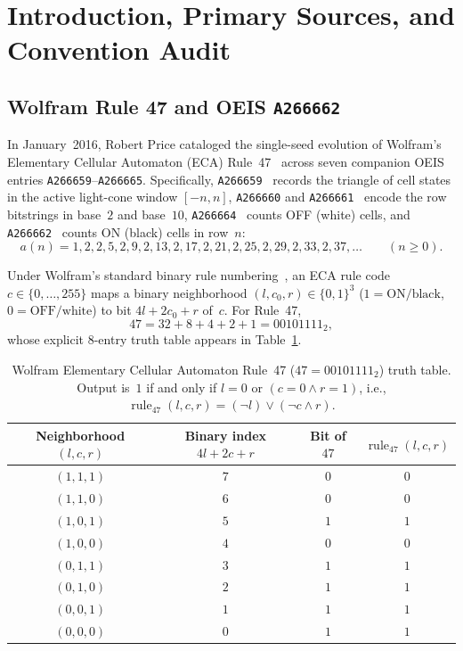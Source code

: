 \documentclass[11pt]{article}
\theoremstyle{definition}
\newcommand{\seq}[1]{\texttt{#1}}
\newcommand{\ruleFS}{\operatorname{rule}_{47}}
\begin{document}
\section{Introduction, Primary Sources, and Convention Audit}

\subsection{Wolfram Rule 47 and OEIS \texorpdfstring{\seq{A266662}}{A266662}}

In January~2016, Robert Price cataloged the single-seed evolution of Wolfram's Elementary Cellular Automaton (ECA) Rule~47~\cite{wolfram2002,mathworldECA} across seven companion OEIS entries \seq{A266659}--\seq{A266665}. Specifically, \seq{A266659}~\cite{oeis266659} records the triangle of cell states in the active light-cone window $[-n, n]$, \seq{A266660} and \seq{A266661}~\cite{oeis266660,oeis266661} encode the row bitstrings in base~$2$ and base~$10$, \seq{A266664}~\cite{oeis266664} counts OFF (white) cells, and \seq{A266662}~\cite{oeis266662} counts ON (black) cells in row~$n$:
\[
a(n) = 1, 2, 2, 5, 2, 9, 2, 13, 2, 17, 2, 21, 2, 25, 2, 29, 2, 33, 2, 37, \dots \qquad (n \ge 0).
\]

Under Wolfram's standard binary rule numbering~\cite{wolfram2002}, an ECA rule code $c \in \{0, \dots, 255\}$ maps a binary neighborhood $(l, c_0, r) \in \{0, 1\}^3$ ($1 = \text{ON/black}$, $0 = \text{OFF/white}$) to bit $4l + 2c_0 + r$ of~$c$. For Rule~47,
\[
47 = 32 + 8 + 4 + 2 + 1 = 00101111_2,
\]
whose explicit $8$-entry truth table appears in Table~\ref{tab:rule47-tt}.

\begin{table}[ht]
\centering
\caption{Wolfram Elementary Cellular Automaton Rule~47 ($47 = 00101111_2$) truth table. Output is~$1$ if and only if $l = 0$ or $(c = 0 \land r = 1)$, i.e., $\ruleFS(l, c, r) = (\neg l) \lor (\neg c \land r)$.}
\label{tab:rule47-tt}
\smallskip
{\small
\begin{tabular}{@{}c c c c@{}}
\toprule
Neighborhood $(l, c, r)$ & Binary index $4l + 2c + r$ & Bit of $47$ & $\ruleFS(l, c, r)$ \\
\midrule
$(1, 1, 1)$ & $7$ & $0$ & $0$ \\
$(1, 1, 0)$ & $6$ & $0$ & $0$ \\
$(1, 0, 1)$ & $5$ & $1$ & $1$ \\
$(1, 0, 0)$ & $4$ & $0$ & $0$ \\
$(0, 1, 1)$ & $3$ & $1$ & $1$ \\
$(0, 1, 0)$ & $2$ & $1$ & $1$ \\
$(0, 0, 1)$ & $1$ & $1$ & $1$ \\
$(0, 0, 0)$ & $0$ & $1$ & $1$ \\
\bottomrule
\end{tabular}
}
\end{table}
\end{document}
